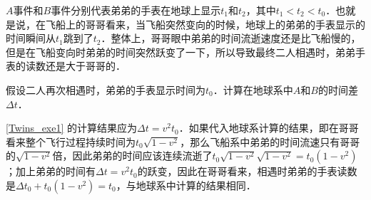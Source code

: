 $A$事件和$B$事件分别代表弟弟的手表在地球上显示$t_1$和$t_2$，其中$t_1<t_2<t_0$．也就是说，在飞船上的哥哥看来，当飞船突然变向的时候，地球上的弟弟的手表显示的时间瞬间从$t_1$跳到了$t_2$．整体上，哥哥眼中弟弟的时间流逝速度还是比飞船慢的，但是在飞船变向时弟弟的时间突然跃变了一下，所以导致最终二人相遇时，弟弟手表的读数还是大于哥哥的．

\begin{exercise}{}\label{Twins_exe1}
假设二人再次相遇时，弟弟的手表显示时间为$t_0$．计算在地球系中$A$和$B$的时间差$\Delta t$．
\end{exercise}

\autoref{Twins_exe1} 的计算结果应为$\Delta t=v^2t_0$．如果代入地球系计算的结果，即在哥哥看来整个飞行过程持续时间为$t_0\sqrt{1-v^2}$，那么飞船系中弟弟的时间流速只有哥哥的$\sqrt{1-v^2}$倍，因此弟弟的时间应该连续流逝了$t_0\sqrt{1-v^2}\sqrt{1-v^2}=t_0(1-v^2)$；加上弟弟的时间有$\Delta t=v^2t_0$的跃变，因此在哥哥看来，相遇时弟弟的手表读数是$\Delta t_0+t_0(1-v^2)=t_0$，与地球系中计算的结果相同．








